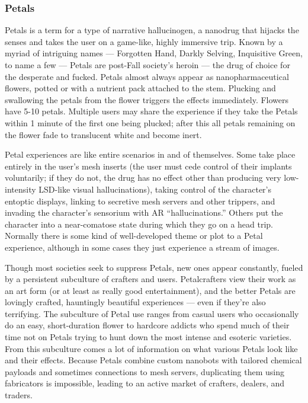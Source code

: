 \subsubsection{Petals}

Petals is a term for a type of narrative hallucinogen, a nanodrug that hijacks the senses and takes the user on a game-like, highly immersive trip. Known by a myriad of intriguing names --- Forgotten Hand, Darkly Selving, Inquisitive Green, to name a few --- Petals are post-Fall society’s heroin --- the drug of choice for the desperate and fucked. Petals almost always appear as nanopharmaceutical flowers, potted or with a nutrient pack attached to the stem. Plucking and swallowing the petals from the flower triggers the effects immediately. Flowers have 5-10 petals. Multiple users may share the experience if they take the Petals within 1 minute of the first one being plucked; after this all petals remaining on the flower fade to translucent white and become inert.

Petal experiences are like entire scenarios in and of themselves. Some take place entirely in the user’s mesh inserts (the user must cede control of their implants voluntarily; if they do not, the drug has no effect other than producing very low-intensity LSD-like visual hallucinations), taking control of the character’s entoptic displays, linking to secretive mesh servers and other trippers, and invading the character’s sensorium with AR ``hallucinations.'' Others put the character into a near-comatose state during which they go on a head trip. Normally there is some kind of well-developed theme or plot to a Petal experience, although in some cases they just experience a stream of images.

Though most societies seek to suppress Petals, new ones appear constantly, fueled by a persistent subculture of crafters and users. Petalcrafters view their work as an art form (or at least as really good entertainment), and the better Petals are lovingly crafted, hauntingly beautiful experiences --- even if they’re also terrifying. The subculture of Petal use ranges from casual users who occasionally do an easy, short-duration flower to hardcore addicts who spend much of their time not on Petals trying to hunt down the most intense and esoteric varieties. From this subculture comes a lot of information on what various Petals look like and their effects. Because Petals combine custom nanobots with tailored chemical payloads and sometimes connections to mesh servers, duplicating them using fabricators is impossible, leading to an active market of crafters, dealers, and traders.

